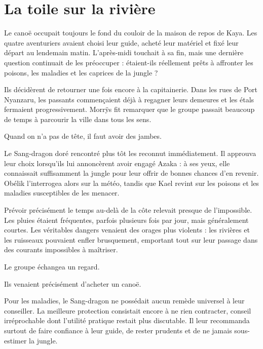 \chapter{La toile sur la rivière}


Le canoë occupait toujours le fond du couloir de la maison de repos de Kaya. Les quatre aventuriers avaient choisi leur guide, acheté leur matériel et fixé leur départ au lendemain matin. L'après-midi touchait à sa fin, mais une dernière question continuait de les préoccuper : étaient-ils réellement prêts à affronter les poisons, les maladies et les caprices de la jungle ?

Ils décidèrent de retourner une fois encore à la capitainerie. Dans les rues de Port Nyanzaru, les passants commençaient déjà à regagner leurs demeures et les étals fermaient progressivement. Morrÿs fit remarquer que le groupe passait beaucoup de temps à parcourir la ville dans tous les sens.

\begin{narrateur}

Quand on n'a pas de tête, il faut avoir des jambes.

\end{narrateur}

Le Sang-dragon doré rencontré plus tôt les reconnut immédiatement. Il approuva leur choix lorsqu'ils lui annoncèrent avoir engagé Azaka : à ses yeux, elle connaissait suffisamment la jungle pour leur offrir de bonnes chances d'en revenir. Obélik l'interrogea alors sur la météo, tandis que Kael revint sur les poisons et les maladies susceptibles de les menacer.

Prévoir précisément le temps au-delà de la côte relevait presque de l'impossible. Les pluies étaient fréquentes, parfois plusieurs fois par jour, mais généralement courtes. Les véritables dangers venaient des orages plus violents : les rivières et les ruisseaux pouvaient enfler brusquement, emportant tout sur leur passage dans des courants impossibles à maîtriser.

Le groupe échangea un regard.

Ils venaient précisément d'acheter un canoë.

Pour les maladies, le Sang-dragon ne possédait aucun remède universel à leur conseiller. La meilleure protection consistait encore à ne rien contracter, conseil irréprochable dont l'utilité pratique restait plus discutable. Il leur recommanda surtout de faire confiance à leur guide, de rester prudents et de ne jamais sous-estimer la jungle.

